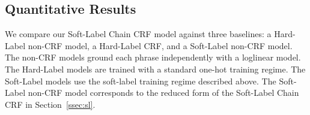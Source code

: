 \documentclass[11pt,a4paper]{article}
\begin{document}
\subsection{Quantitative Results}

\begin{table}
    \centering
    \caption{Performance of Soft-Label Chain CRF models by conditioning transition scores on different sets of context features. --: input to transition score prediction is . M: input extended by features of context  in between the two phrases. M+LR: input further extended by features of LHS phrase  and RHS phrase . M+LR+G: input further extended by features of global context . }
    \label{tab:acc-tran}
\end{table}

\begin{table}
    \centering
    \caption{Decoding algorithms' impact on performance. }
    \label{tab:acc-decode}
\end{table}

We compare our Soft-Label Chain CRF model against three baselines: a Hard-Label non-CRF model, a Hard-Label CRF, and a Soft-Label non-CRF model. The non-CRF models ground each phrase independently with a loglinear model. 
The Hard-Label models are trained with a standard one-hot training regime. The Soft-Label models use the soft-label training regime described above. The Soft-Label non-CRF model corresponds to the reduced form of the Soft-Label Chain CRF in Section~\ref{ssec:sl}. 
\end{document}
